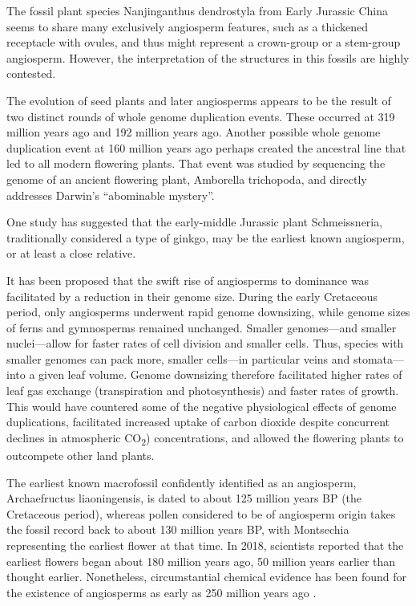 The fossil plant species Nanjinganthus dendrostyla from Early Jurassic China seems to share many exclusively angiosperm features, such as a thickened receptacle with ovules, and thus might represent a crown-group or a stem-group angiosperm. However, the interpretation of the structures in this fossils are highly contested.

The evolution of seed plants and later angiosperms appears to be the result of two distinct rounds of whole genome duplication events. These occurred at 319 million years ago and 192 million years ago. Another possible whole genome duplication event at 160 million years ago perhaps created the ancestral line that led to all modern flowering plants. That event was studied by sequencing the genome of an ancient flowering plant, Amborella trichopoda, and directly addresses Darwin's ``abominable mystery''.

One study has suggested that the early-middle Jurassic plant Schmeissneria, traditionally considered a type of ginkgo, may be the earliest known angiosperm, or at least a close relative.

It has been proposed that the swift rise of angiosperms to dominance was facilitated by a reduction in their genome size. During the early Cretaceous period, only angiosperms underwent rapid genome downsizing, while genome sizes of ferns and gymnosperms remained unchanged. Smaller genomes---and smaller nuclei---allow for faster rates of cell division and smaller cells. Thus, species with smaller genomes can pack more, smaller cells---in particular veins and stomata---into a given leaf volume. Genome downsizing therefore facilitated higher rates of leaf gas exchange (transpiration and photosynthesis) and faster rates of growth. This would have countered some of the negative physiological effects of genome duplications, facilitated increased uptake of carbon dioxide despite concurrent declines in atmospheric CO\textsubscript{2}) concentrations, and allowed the flowering plants to outcompete other land plants.

The earliest known macrofossil confidently identified as an angiosperm, Archaefructus liaoningensis, is dated to about 125 million years BP (the Cretaceous period), whereas pollen considered to be of angiosperm origin takes the fossil record back to about 130 million years BP, with Montsechia representing the earliest flower at that time. In 2018, scientists reported that the earliest flowers began about 180 million years ago, 50 million years earlier than thought earlier. Nonetheless, circumstantial chemical evidence has been found for the existence of angiosperms as early as 250 million years ago .


